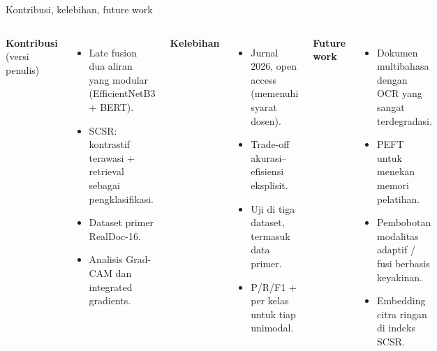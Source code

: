 \documentclass[aspectratio=169,10pt]{beamer}
\newcommand\kecil{\fontsize{8}{9.5}\selectfont}
\begin{document}
\begin{frame}{Kontribusi, kelebihan, future work}
  \begin{columns}[T]
    \textbf{Kontribusi} (versi penulis)
    \begin{itemize}\kecil
      \item Late fusion dua aliran yang modular (EfficientNetB3 + BERT).
      \item SCSR: kontrastif terawasi + retrieval sebagai pengklasifikasi.
      \item Dataset primer RealDoc-16.
      \item Analisis Grad-CAM dan integrated gradients.
    \end{itemize}
    \textbf{Kelebihan}
    \begin{itemize}\kecil
      \item Jurnal 2026, open access (memenuhi syarat dosen).
      \item Trade-off akurasi--efisiensi eksplisit.
      \item Uji di tiga dataset, termasuk data primer.
      \item P/R/F1 + per kelas untuk tiap unimodal.
    \end{itemize}
    \textbf{Future work}
    \begin{itemize}\kecil
      \item Dokumen multibahasa dengan OCR yang sangat terdegradasi.
      \item PEFT untuk menekan memori pelatihan.
      \item Pembobotan modalitas adaptif / fusi berbasis keyakinan.
      \item Embedding citra ringan di indeks SCSR.
    \end{itemize}
  \end{columns}
\end{frame}
\end{document}
